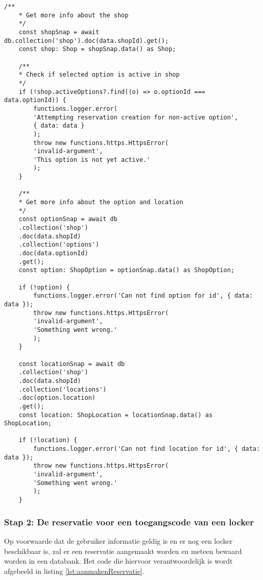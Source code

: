 \begin{lstlisting}[caption={Het informatie ophalen van de geselecteerde locatie. Aan de hand van geselecteerde evenement kan er gegevens uit de databank gehaald worden.}, label={lst:ophalenEventInfo}]
    /**
    * Get more info about the shop
    */
    const shopSnap = await db.collection('shop').doc(data.shopId).get();
    const shop: Shop = shopSnap.data() as Shop;
    
    /**
    * Check if selected option is active in shop
    */
    if (!shop.activeOptions?.find((o) => o.optionId === data.optionId)) {
        functions.logger.error(
        'Attempting reservation creation for non-active option',
        { data: data }
        );
        throw new functions.https.HttpsError(
        'invalid-argument',
        'This option is not yet active.'
        );
    }
    
    /**
    * Get more info about the option and location
    */
    const optionSnap = await db
    .collection('shop')
    .doc(data.shopId)
    .collection('options')
    .doc(data.optionId)
    .get();
    const option: ShopOption = optionSnap.data() as ShopOption;
    
    if (!option) {
        functions.logger.error('Can not find option for id', { data: data });
        throw new functions.https.HttpsError(
        'invalid-argument',
        'Something went wrong.'
        );
    }
    
    const locationSnap = await db
    .collection('shop')
    .doc(data.shopId)
    .collection('locations')
    .doc(option.location)
    .get();
    const location: ShopLocation = locationSnap.data() as ShopLocation;
    
    if (!location) {
        functions.logger.error('Can not find location for id', { data: data });
        throw new functions.https.HttpsError(
        'invalid-argument',
        'Something went wrong.'
        );
    }
\end{lstlisting}

\subsubsection{Stap 2: De reservatie voor een toegangscode van een locker}%
Op voorwaarde dat de gebruiker informatie geldig is en er nog een locker beschikbaar is, zal er een reservatie aangemaakt worden en meteen bewaard worden in een databank. Het code die hiervoor verantwoordelijk is wordt afgebeeld in listing \ref{lst:aanmakenReservatie}.

